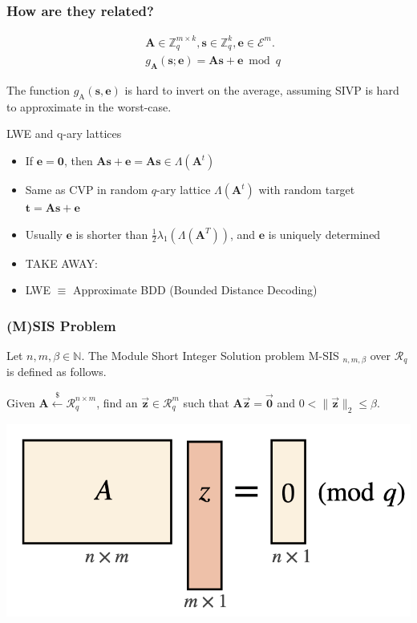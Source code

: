 \documentclass{beamer}
\begin{document}
\begin{frame}
	\frametitle{How are they related?}
	$$
\begin{aligned}
& \mathbf{A} \in \mathbb{Z}_q^{m \times k}, \mathbf{s} \in \mathbb{Z}_q^k, \mathbf{e} \in \mathcal{E}^m . \\
& g_{\mathbf{A}}(\mathbf{s} ; \mathbf{e})=\mathbf{A} \mathbf{s}+\mathbf{e} \bmod q
\end{aligned}
$$
	\begin{theorem} [R'05]
The function $g_{\mathrm{A}}(\mathbf{s}, \mathbf{e})$ is hard to invert on the average, assuming SIVP is hard to approximate in the worst-case. 
	\end{theorem}
	
		
	LWE and q-ary lattices
	\begin{itemize}
		\item If $\mathbf{e}=\mathbf{0}$, then $\mathbf{A s}+\mathbf{e}=\mathbf{A} \mathbf{s} \in \Lambda\left(\mathbf{A}^t\right)$
		\item Same as CVP in random $q$-ary lattice $\Lambda\left(\mathbf{A}^t\right)$ with random target $\mathbf{t}=\mathbf{A s + e}$
		\item Usually $\mathbf{e}$ is shorter than $\frac{1}{2} \lambda_1\left(\Lambda\left(\mathbf{A}^T\right)\right)$, and $\mathbf{e}$ is uniquely determined
		\item TAKE AWAY: 
		\item LWE $\equiv$ Approximate BDD (Bounded Distance Decoding)
	\end{itemize}

\end{frame}



\begin{frame}
\frametitle{(M)SIS Problem}

\begin{definition}
	Let $n, m, \beta \in \mathbb{N}$. The Module Short Integer Solution problem M-SIS $_{n, m, \beta}$ over $\mathcal{R}_q$ is defined as follows. 
	
	Given $\boldsymbol{A} \stackrel{\$}{\leftarrow} \mathcal{R}_q^{n \times m}$, find an $\overrightarrow{\boldsymbol{z}} \in \mathcal{R}_q^m$ such that $\boldsymbol{A} \overrightarrow{\boldsymbol{z}}=\overrightarrow{\mathbf{0}}$ and $0<\|\overrightarrow{\boldsymbol{z}}\|_2 \leq \beta$.
\end{definition}

\includegraphics[scale=0.6]{sisfig.png}

\end{frame}
\end{document}
